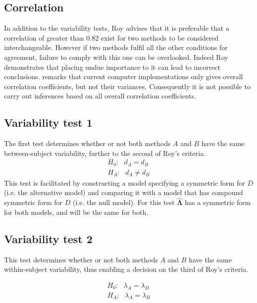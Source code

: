\documentclass[MAIN.tex]{subfiles}
\begin{document}
	
	
	
	\subsection{Correlation}
	In addition to the variability tests, Roy advises that it is preferable that a correlation of greater than $0.82$ exist for two methods to be considered interchangeable. However if two methods fulfil all the other conditions for agreement, failure to comply with this one can be overlooked. Indeed Roy demonstrates that placing undue importance to it can lead to incorrect conclusions. \citet{roy} remarks that current computer implementations only gives overall correlation coefficients, but not their variances. Consequently it is not possible to carry out inferences based on all overall correlation coefficients.
	
	\subsection{Variability test 1}
	The first test determines whether or not both methods $A$ and $B$ have the same between-subject variability, further to the second of Roy's criteria.
	\begin{eqnarray*}
		H_{0}: \mbox{ }d_{A}  = d_{B} \\
		H_{A}: \mbox{ }d_{A}  \neq d_{B}
	\end{eqnarray*}
	This test is facilitated by constructing a model specifying a symmetric form for $D$ (i.e. the alternative model) and comparing it with a model that has compound symmetric form for $D$ (i.e. the null model). For this test $\boldsymbol{\hat{\Lambda}}$ has a symmetric form for both models, and will be the same for both.
	
	\subsection{Variability test 2}
	
	This test determines whether or not both methods $A$ and $B$ have the same within-subject variability, thus enabling a decision on the third of Roy's criteria.
	
	\begin{eqnarray*}
		H_{0}: \mbox{ }\lambda_{A}  = \lambda_{B} \\
		H_{A}: \mbox{ }\lambda_{A}  = \lambda_{B}
	\end{eqnarray*}
	
\end{document}
